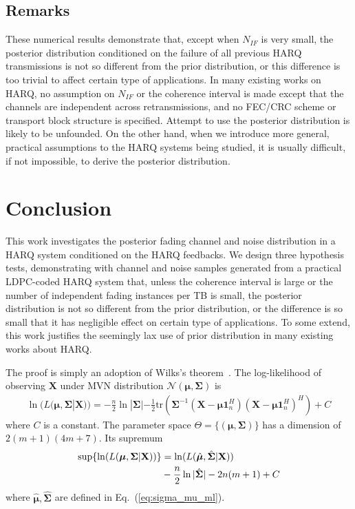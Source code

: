 \documentclass[journal,draftcls,onecolumn,12pt,twoside]{IEEEtran}
\begin{document}
\subsection{Remarks}
These numerical results demonstrate that, except when $N_{IF}$ is very small,
the posterior distribution conditioned on the failure of all previous HARQ
transmissions is not so different from the prior distribution, or this
difference is too trivial to affect certain type of applications. 
In many existing works on HARQ, no assumption on $N_{IF}$ or the coherence
interval is made except that the channels are independent across
retransmissions, and no FEC/CRC scheme or transport block structure is
specified. Attempt to use the posterior distribution is likely to be unfounded.
On the other hand, when we introduce more general, practical assumptions to the
HARQ systems being studied, it is usually difficult, if not impossible, to
derive the posterior distribution.

\section{Conclusion}
\label{sec:conclusion}
This work investigates the posterior fading channel and noise distribution in
a HARQ system conditioned on the HARQ feedbacks. We design three hypothesis tests,
demonstrating with channel and noise samples generated from a practical
LDPC-coded HARQ system that, unless the coherence interval is large or the
number of independent fading instances per TB is small, the posterior distribution is
not so different from the prior distribution, or the difference is so small that
it has negligible effect on certain type of applications. To some extend, this
work justifies the seemingly lax use of prior distribution in many existing
works about HARQ.

\label{append:proof}
The proof is simply an adoption of Wilks's theorem~\cite{wilks1938large}. The
log-likelihood of observing $\mathbf{X}$ under MVN distribution
$\mathcal{N}(\bm{\mu}, \mathbf{\Sigma})$ is
\begin{align}
  \ln(L(\bm{\mu}, \mathbf{\Sigma}|\mathbf{X})) =
  -\frac{n}{2}\ln|\mathbf{\Sigma}|-
  \frac{1}{2}\mbox{tr}(\mathbf{\Sigma}^{-1}(\mathbf{X}
  -\bm{\mu}\mathbf{1}_n^H)(\mathbf{X} -\bm{\mu}\mathbf{1}_n^H)^H) + C  
\end{align}
where $C$ is a constant. The parameter space $\Theta = \{(\bm{\mu},
\mathbf{\Sigma})\}$ has a dimension of $2(m+1)(4m+7)$. Its supremum
\begin{align}
  \sup \{\ln(L(\bm{\mu}, \mathbf{\Sigma}|\mathbf{X}))\} & =
  \ln(L(\hat{\bm{\mu}}, \hat{\mathbf{\Sigma}}|\mathbf{X})) \notag\\
  & -\frac{n}{2}\ln|\hat{\mathbf{\Sigma}}| - 2n(m+1) + C
\end{align}
where $\hat{\bm{\mu}}, \hat{\mathbf{\Sigma}}$ are defined in
Eq.~(\ref{eq:sigma_mu_ml}).
\end{document}
